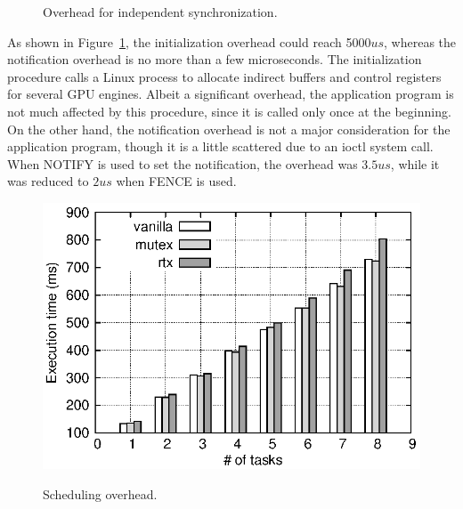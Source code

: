 \begin{figure}[!t]
\begin{center}
\caption{Overhead for independent synchronization.}
\vspace{-4mm}
\label{fig:irq_rise_overhead}
\end{center}
\end{figure}

As shown in Figure~\ref{fig:irq_rise_overhead}, the initialization overhead could reach 5000$us$, whereas the notification overhead is no more than a few microseconds.
The initialization procedure calls a Linux process to allocate indirect buffers and control registers for several GPU engines.
Albeit a significant overhead, the application program is not much affected by this procedure, since it is called only once at the beginning.
On the other hand, the notification overhead is not a major consideration for the application program, though it is a little scattered due to an ioctl system call.
When NOTIFY is used to set the notification, the overhead was $3.5us$, while it was reduced to $2us$ when FENCE is used.

\label{sec:eval:sched_overhead}

\begin{figure}[!t]
\begin{center}
\includegraphics[width=.44\textwidth]{img/sum_task.eps}
\caption{Scheduling overhead.}
\vspace{-4mm}
\label{fig:fp_task_overhead}
\end{center}
\end{figure}

